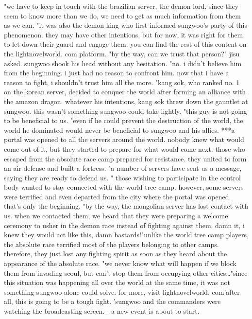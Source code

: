 "we have to keep in touch with the brazilian server, the demon lord.
 since they seem to know more than we do, we need to get as much information from them as we can.
"it was also the demon king who first informed sungwoo's party of this phenomenon.
 they may have other intentions, but for now, it was right for them to let down their guard and engage them.
you can find the rest of this content on the lightnovelworld.
com platform.
"by the way, can we trust that person?" jisu asked.
sungwoo shook his head without any hesitation.
"no.
 i didn't believe him from the beginning.
 i just had no reason to confront him.
 now that i have a reason to fight, i shouldn't trust him all the more.
"kang sok, who ranked no.
 1 on the korean server, decided to conquer the world after forming an alliance with the amazon dragon.
whatever his intentions, kang sok threw down the gauntlet at sungwoo.
this wasn't something sungwoo could take lightly.
"this guy is not going to be beneficial to us.
"even if he could prevent the destruction of the world, the world he dominated would never be beneficial to sungwoo and his allies.
***a portal was opened to all the servers around the world.
nobody knew what would come out of it, but they started to prepare for what would come next.
those who escaped from the absolute race camp prepared for resistance.
 they united to form an air defense and built a fortress.
"a number of servers have sent us a message, saying they are ready to defend us.
"
those wishing to participate in the control body wanted to stay connected with the world tree camp.
 however, some servers were terrified and even departed from the city where the portal was opened.
 that's only the beginning.
"by the way, the mongolian server has lost contact with us.
 when we contacted them, we heard that they were preparing a welcome ceremony to usher in the demon race instead of fighting against them.
 damn it, i knew they would act like this, damn bastards!"unlike the world tree camp players, the absolute race terrified most of the players belonging to other camps.
therefore, they just lost any fighting spirit as soon as they heard about the appearance of the absolute race.
"we never know what will happen if we block them from invading seoul, but can't stop them from occupying other cities…"since this situation was happening all over the world at the same time, it was not something sungwoo alone could solve.
for more, visit lightnov‌elworld.
com'after all, this is going to be a tough fight.
'sungwoo and the commanders were watching the broadcasting screen.
- a new event is about to start.
